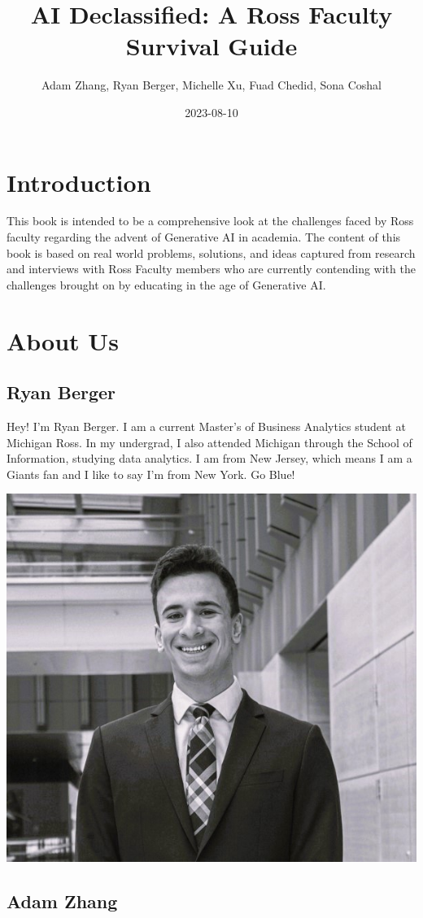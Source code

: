 \documentclass[
]{book}
\title{AI Declassified: A Ross Faculty Survival Guide}
\author{Adam Zhang, Ryan Berger, Michelle Xu, Fuad Chedid, Sona Coshal}
\date{2023-08-10}
\begin{document}
\maketitle

{
\setcounter{tocdepth}{1}
\tableofcontents
}
\hypertarget{introduction}{%
\chapter{Introduction}\label{introduction}}

This book is intended to be a comprehensive look at the challenges faced by Ross faculty regarding the advent of Generative AI in academia. The content of this book is based on real world problems, solutions, and ideas captured from research and interviews with Ross Faculty members who are currently contending with the challenges brought on by educating in the age of Generative AI.

\hypertarget{about-us}{%
\chapter{About Us}\label{about-us}}

\hypertarget{ryan-berger}{%
\section{Ryan Berger}\label{ryan-berger}}

Hey! I'm Ryan Berger. I am a current Master's of Business Analytics student at Michigan Ross. In my undergrad, I also attended Michigan through the School of Information, studying data analytics. I am from New Jersey, which means I am a Giants fan and I like to say I'm from New York. Go Blue!

\includegraphics[width=0.4\linewidth]{rtberger}

\hypertarget{adam-zhang}{%
\section{Adam Zhang}\label{adam-zhang}}
\end{document}
